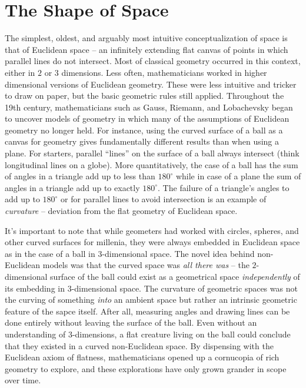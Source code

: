 \section*{The Shape of Space}

The simplest, oldest, and arguably most intuitive conceptualization of space is that of Euclidean space -- an infinitely extending flat canvas of points in which parallel lines do not intersect. Most of classical geometry occurred in this context, either in $2$ or $3$ dimensions.
Less often, mathematicians worked in higher dimensional versions of Euclidean geometry. These were less intuitive and tricker to draw on paper, but the basic geometric rules still applied.
Throughout the 19th century, mathematicians such as Gauss, Riemann, and Lobachevsky began to uncover models of geometry in which many of the assumptions of Euclidean geometry no longer held.
For instance, using the curved surface of a ball as a canvas for geometry gives fundamentally different results than when using a plane. For starters, parallel ``lines'' on the surface of a ball always intersect (think longitudinal lines on a globe).
More quantitatively, the case of a ball has the sum of angles in a triangle add up to less than $180^\circ$ while in case of a plane the sum of angles in a triangle add up to exactly $180^\circ$. The failure of a triangle's angles to add up to $180^\circ$ or for parallel lines to avoid intersection is an example of \emph{curvature} -- deviation from the flat geometry of Euclidean space.

It's important to note that while geometers had worked with circles, spheres, and other curved surfaces for millenia, they were always embedded in Euclidean space as in the case of a ball in $3$-dimensional space. The novel idea behind non-Euclidean models was that the curved space was \emph{all there was} -- the $2$-dimensional surface of the ball could exist as a geometrical space \emph{independently} of its embedding in $3$-dimensional space.
The curvature of geometric spaces was not the curving of something \emph{into} an ambient space but rather an intrinsic geometric feature of the sapce itself. After all, measuring angles and drawing lines can be done entirely without leaving the surface of the ball. Even without an understanding of $3$-dimensions, a flat creature living on the ball could conclude that they existed in a curved non-Euclidean space.
By dispensing with the Euclidean axiom of flatness, mathematicians opened up a cornucopia of rich geometry to explore, and these explorations have only grown grander in scope over time.

